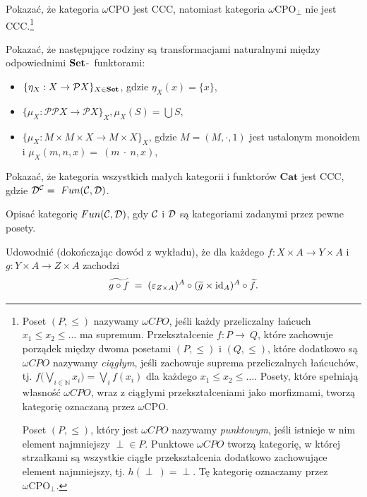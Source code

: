 \begin{zadanie}\label{zad:omega-cpo}
Pokazać, że kategoria $\omega \mathrm{CPO}$ jest CCC, natomiast kategoria $\omega \mathrm{CPO}_\perp$ nie jest CCC.\footnote{Poset $(P,\leq)$ nazywamy $\omega CPO$, jeśli każdy przeliczalny łańcuch $x_1\leq x_2 \leq \dots$ ma supremum. Przekształcenie $f:P\to~Q$, które zachowuje porządek między dwoma posetami $(P,\leq)$ i $(Q,\leq)$, które dodatkowo są $\omega CPO$ nazywamy \emph{ciągłym}, jeśli zachowuje suprema przeliczalnych łańcuchów, tj. $f\Big(\bigvee_{i\in \mathbb{N}} x_i\Big) = \bigvee_{i} f(x_i)$ dla każdego $x_1\leq x_2\leq \ldots$. Posety, które spełniają własność $\omega CPO$, wraz z ciągłymi przekształceniami jako morfizmami, tworzą kategorię oznaczaną przez $\omega\mathrm{CPO}$. 

Poset $(P,\leq)$, który jest $\omega CPO$ nazywamy \emph{punktowym}, jeśli istnieje w nim element najmniejszy $\perp\in P$. Punktowe $\omega CPO$ tworzą kategorię, w której strzałkami są wszystkie ciągłe przekształcenia dodatkowo zachowujące element najmniejszy, tj. $h(\perp~)= \perp$. Tę kategorię oznaczamy przez $\omega \mathrm{CPO}_\perp$.}  
\end{zadanie}

\begin{zadanie}\label{zad:nat-set}
Pokazać, że następujące rodziny są transformacjami naturalnymi między odpowiednimi $\mathbf{Set}$-~funktorami:
\begin{itemize}
\item $\{\eta_X:X\to \mathcal{P}X\}_{X\in \mathbf{Set}}$, gdzie $\eta_X(x) = \{x\}$,
\item $\{\mu_X: \mathcal{P}\mathcal{P}X\to \mathcal{P}X\}_{X}, \mu_X(S) =\bigcup S$,
\item $\{\mu_{X}:M\times M\times X\to M\times X\}_{X}$, gdzie $M=(M,\cdot,1)$ jest ustalonym monoidem i $\mu_{X}(m,n,x) =~(m~\cdot~n,x)$,
\end{itemize}
\end{zadanie}

\begin{zadanie}
Pokazać, że kategoria wszystkich małych kategorii i funktorów $\mathbf{Cat}$ jest CCC, gdzie $\mathcal{D}^{\mathcal{C}} =~Fun(\mathcal{C},\mathcal{D})$. 
\end{zadanie}

\begin{zadanie}
Opisać kategorię $Fun(\mathcal{C},\mathcal{D})$, gdy $\mathcal{C}$ i $\mathcal{D}$ są kategoriami zadanymi przez pewne posety.
\end{zadanie}

\begin{zadanie}\label{zad:transpozycja}
Udowodnić (dokończając dowód z wykładu), że dla każdego $f\colon X\times A\to Y\times A$ i $g\colon Y\times A\to Z\times A$ zachodzi
\[
\widetilde{g\circ f} \;=\; (\varepsilon_{Z\times A})^A \circ (\widetilde{g}\times\mathrm{id}_A)^A \circ \widetilde{f}.
\]
\end{zadanie}

